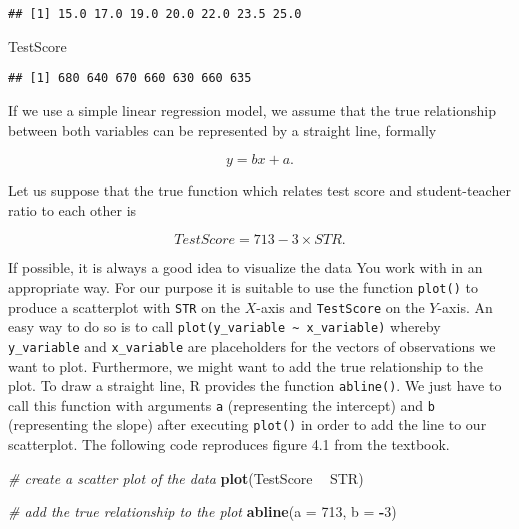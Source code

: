 \documentclass[]{book}
\newenvironment{Shaded}{\begin{snugshade}}{\end{snugshade}}
\newcommand{\KeywordTok}[1]{\textcolor[rgb]{0.13,0.29,0.53}{\textbf{#1}}}
\newcommand{\DataTypeTok}[1]{\textcolor[rgb]{0.13,0.29,0.53}{#1}}
\newcommand{\DecValTok}[1]{\textcolor[rgb]{0.00,0.00,0.81}{#1}}
\newcommand{\StringTok}[1]{\textcolor[rgb]{0.31,0.60,0.02}{#1}}
\newcommand{\CommentTok}[1]{\textcolor[rgb]{0.56,0.35,0.01}{\textit{#1}}}
\newcommand{\OperatorTok}[1]{\textcolor[rgb]{0.81,0.36,0.00}{\textbf{#1}}}
\newcommand{\NormalTok}[1]{#1}
\theoremstyle{definition}
\theoremstyle{definition}
\theoremstyle{definition}
\theoremstyle{remark}
\begin{document}
\begin{verbatim}
## [1] 15.0 17.0 19.0 20.0 22.0 23.5 25.0
\end{verbatim}

\begin{Shaded}
\begin{Highlighting}[]
\NormalTok{TestScore}
\end{Highlighting}
\end{Shaded}

\begin{verbatim}
## [1] 680 640 670 660 630 660 635
\end{verbatim}

If we use a simple linear regression model, we assume that the true
relationship between both variables can be represented by a straight
line, formally

\[ y = bx + a. \]

Let us suppose that the true function which relates test score and
student-teacher ratio to each other is

\[TestScore = 713 - 3 \times STR.\]

If possible, it is always a good idea to visualize the data You work
with in an appropriate way. For our purpose it is suitable to use the
function \texttt{plot()} to produce a scatterplot with \texttt{STR} on
the \(X\)-axis and \texttt{TestScore} on the \(Y\)-axis. An easy way to
do so is to call
\texttt{plot(y\_variable\ \textasciitilde{}\ x\_variable)} whereby
\texttt{y\_variable} and \texttt{x\_variable} are placeholders for the
vectors of observations we want to plot. Furthermore, we might want to
add the true relationship to the plot. To draw a straight line, R
provides the function \texttt{abline()}. We just have to call this
function with arguments \texttt{a} (representing the intercept) and
\texttt{b} (representing the slope) after executing \texttt{plot()} in
order to add the line to our scatterplot. The following code reproduces
figure 4.1 from the textbook.

\begin{Shaded}
\begin{Highlighting}[]
\CommentTok{# create a scatter plot of the data}
\KeywordTok{plot}\NormalTok{(TestScore }\OperatorTok{~}\StringTok{ }\NormalTok{STR)}

\CommentTok{# add the true relationship to the plot}
\KeywordTok{abline}\NormalTok{(}\DataTypeTok{a =} \DecValTok{713}\NormalTok{, }\DataTypeTok{b =} \OperatorTok{-}\DecValTok{3}\NormalTok{)}
\end{Highlighting}
\end{Shaded}
\end{document}
